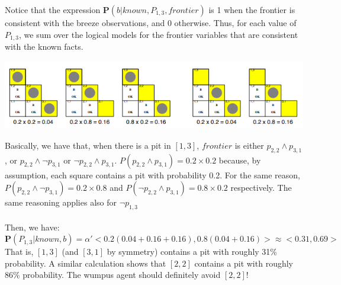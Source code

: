 Notice that the expression $\textbf{P}(b | known, P_{1,3}, frontier )$ is 1 when the frontier is consistent with the breeze observations, and 0 otherwise. Thus, for each value of $P_{1,3}$, we sum over the logical models for the frontier variables that are consistent with the known facts.
\begin{center}
    \includegraphics[]{images/wumpus-frontier.png}
\end{center}
Basically, we have that, when there is a pit in $[1,3]$, $frontier$ is either $p_{2,2} \land p_{3,1}$, or $p_{2,2} \land \neg p_{3,1}$ or $\neg p_{2,2} \land p_{3,1}$. $P(p_{2,2} \land p_{3,1}) = 0.2 \times 0.2$ because, by assumption, each square contains a pit with probability 0.2. For the same reason, $P(p_{2,2} \land \neg p_{3,1}) = 0.2 \times 0.8$ and $P(\neg p_{2,2} \land p_{3,1}) = 0.8 \times 0.2$ respectively. The same reasoning applies also for $\neg p_{1, 3}$ 
\\\\
Then, we have:
\[\textbf{P}(P_{1,3} | known, b) = \alpha ' <0.2(0.04 + 0.16 + 0.16), 0.8(0.04 + 0.16)> \approx <0.31, 0.69>\]
That is, $[1,3]$ (and $[3,1]$ by symmetry) contains a pit with roughly 31\% probability. A similar calculation shows that $[2,2]$ contains a pit with
roughly 86\% probability. The wumpus agent should definitely avoid $[2,2]$!

